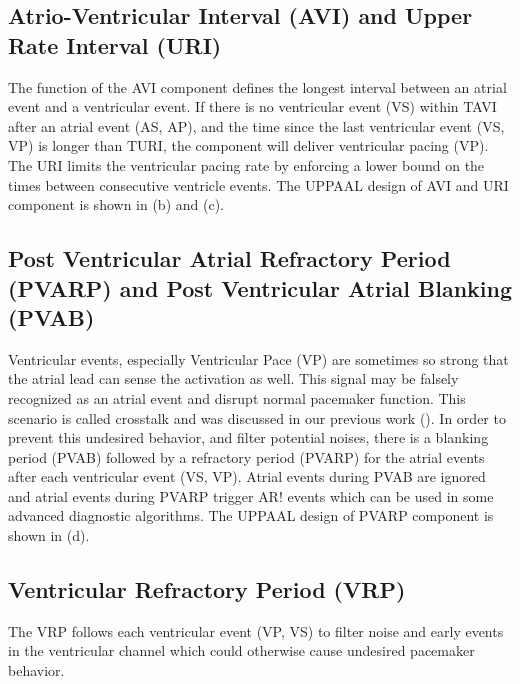 \subsection{Atrio-Ventricular Interval (AVI) and Upper Rate Interval (URI)}
The function of the AVI component defines the longest interval between an atrial event and a ventricular event. If there is no ventricular event \textsf{(VS)}  within TAVI after an atrial event \textsf{(AS, AP)}, and the time since the last ventricular event \textsf{(VS, VP)} is longer than TURI, the component will deliver ventricular pacing \textsf{(VP)}. The URI limits the ventricular pacing rate by enforcing a lower bound on the times between consecutive ventricle events. The UPPAAL design of AVI and URI component is shown in (b) and (c).%

\subsection{Post Ventricular Atrial Refractory Period (PVARP) and Post Ventricular Atrial Blanking (PVAB)}
Ventricular events, especially Ventricular Pace \textsf{(VP)} are sometimes so strong that the atrial lead can sense the activation as well. This signal may be falsely recognized as an atrial event and disrupt normal pacemaker function. This scenario is called crosstalk and was discussed in our previous work (\cite{vhm_embc11}). In order to prevent this undesired behavior, and filter potential noises, there is a blanking period (PVAB) followed by a refractory period (PVARP) for the atrial events after each ventricular event \textsf{(VS, VP)}. Atrial events during PVAB are ignored and atrial events during PVARP trigger \textsf{AR!} events which can be used in some advanced diagnostic algorithms. The UPPAAL design of PVARP component is shown in (d).

\subsection{Ventricular Refractory Period (VRP)}
The VRP follows each ventricular event \textsf{(VP, VS)} to filter noise and early events in the ventricular channel which could otherwise cause undesired pacemaker behavior. 

